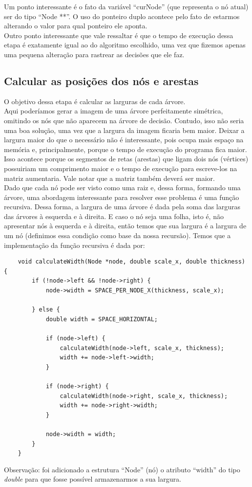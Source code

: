 \documentclass[12pt,a4paper]{article}
\begin{document}
	\indent Um ponto interessante é o fato da variável “curNode” (que representa o nó atual) ser do tipo “Node **”. O uso do ponteiro duplo acontece pelo fato de estarmos alterando o valor para qual ponteiro ele aponta.\\
	\indent Outro ponto interessante que vale ressaltar é que o tempo de execução dessa etapa é exatamente igual ao do algoritmo escolhido, uma vez que fizemos apenas uma pequena alteração para rastrear as decisões que ele faz.



	\subsection{Calcular as posições dos nós e arestas}
	\indent O objetivo dessa etapa é calcular as larguras de cada árvore.\\
	\indent Aqui poderíamos gerar a imagem de uma árvore perfeitamente simétrica, omitindo os nós que não aparecem na árvore de decisão. Contudo, isso não seria uma boa solução, uma vez que a largura da imagem ficaria bem maior. Deixar a largura maior do que o necessário não é interessante, pois ocupa mais espaço na memória e, principalmente, porque o tempo de execução do programa fica maior. Isso acontece porque os segmentos de retas (arestas) que ligam dois nós (vértices) possuiriam um comprimento maior e o tempo de execução para escreve-los na matriz aumentaria. Vale notar que a matriz também deverá ser maior.\\
	\indent Dado que cada nó pode ser visto como uma raiz e, dessa forma, formando uma árvore, uma abordagem interessante para resolver esse problema é uma função recursiva. Dessa forma, a largura de uma árvore é dada pela soma das larguras das árvores à esquerda e à direita. E caso o nó seja uma folha, isto é, não apresentar nós à esquerda e à direita, então temos que sua largura é a largura de um nó (definimos essa condição como base da nossa recursão). 
	\indent Temos que a implementação da função recursiva é dada por:\\
	\begin{minipage}{\linewidth}
	\begin{lstlisting}
	void calculateWidth(Node *node, double scale_x, double thickness) {
		if (!node->left && !node->right) {
			node->width = SPACE_PER_NODE_X(thickness, scale_x);

		} else {
			double width = SPACE_HORIZONTAL;

			if (node->left) {
				calculateWidth(node->left, scale_x, thickness);
				width += node->left->width;
			}

			if (node->right) {
				calculateWidth(node->right, scale_x, thickness);
				width += node->right->width;
			}

			node->width = width;
		}
	}
	\end{lstlisting}
	\end{minipage}
	\indent Observação: foi adicionado a estrutura “Node” (nó) o atributo “width” do tipo \textit{double} para que fosse possível armazenarmos a sua largura.
\end{document}
